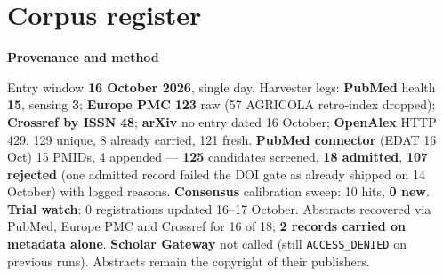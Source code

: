 \documentclass[10pt]{article}
\begin{document}
\clearpage
\section*{\sffamily\bfseries\color{Deep}Corpus register}
\vspace{-1.5mm}{\color{Amber}\rule{\linewidth}{1.1pt}}\vspace{2.5mm}



\vspace{2mm}

\begin{keybox}
{\sffamily\bfseries\footnotesize\color{Deep}Provenance and method}\\[1.2mm]
{\fontsize{7.2}{8.8}\selectfont
Entry window \textbf{16 October 2026}, single day. Harvester legs: \textbf{PubMed} health \textbf{15},
sensing \textbf{3}; \textbf{Europe PMC} \textbf{123} raw (57 AGRICOLA retro-index dropped); \textbf{Crossref by ISSN}
\textbf{48}; \textbf{arXiv} no entry dated 16 October; \textbf{OpenAlex} HTTP 429. 129 unique, 8 already carried,
121 fresh. \textbf{PubMed connector} (EDAT 16 Oct) 15 PMIDs, 4 appended --- \textbf{125} candidates screened,
\textbf{18 admitted}, \textbf{107 rejected} (one admitted record failed the DOI gate as already shipped on 14 October) with logged reasons. \textbf{Consensus} calibration sweep: 10 hits,
\textbf{0 new}. \textbf{Trial watch}: 0 registrations updated 16--17 October. Abstracts recovered via PubMed,
Europe PMC and Crossref for 16 of 18; \textbf{2 records carried on metadata alone}. \textbf{Scholar Gateway} not
called (still \texttt{ACCESS\_DENIED} on previous runs). Abstracts remain the copyright of their publishers.\par}
\end{keybox}
\end{document}
